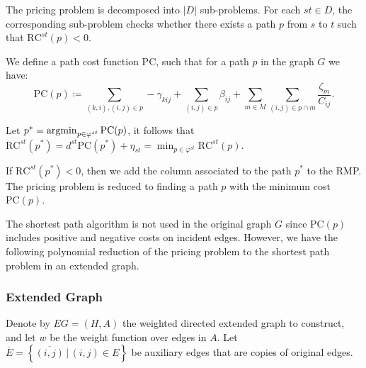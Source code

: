 The pricing problem is decomposed into $|D|$ sub-problems. For each $st \in D$, the corresponding sub-problem checks whether there exists a path \(p\) from $s$ to $t$ such that \(\textrm{RC}^{st}(p) < 0\).

We define a path cost function \(\textrm{PC}\), such that for a path $p$ in the graph $G$ we have:
\begin{equation}\textrm{PC}(p) \coloneqq \sum_{(k,i),(i,j) \in p} -\gamma_{kij}+\sum_{(i,j) \in p} \beta_{ij} +\sum_{m \in M}\sum_{(i,j) \in p \cap m} \frac{\zeta_{m}}{C_{ij}}.
\end{equation}

Let $p^\ast = \operatorname{argmin}_{p \in \varphi^{st}} \textrm{PC}(p)$, it follows that $\textrm{RC}^{st}(p^\ast) = d^{st} \textrm{PC}(p^\ast) + \eta_{st}  = \min_{p \in \varphi^{st}}\textrm{RC}^{st}(p)$.

If $\textrm{RC}^{st}(p^\ast) <0$, then we add the column associated to the path \(p^\ast\) to the RMP. \\

The pricing problem is reduced to finding a path $p$ with the minimum cost $\textrm{PC}(p)$.

The shortest path algorithm is not used in the original graph \(G\) since \(\textrm{PC}(p)\) includes positive and negative costs on incident edges. However, we have the following polynomial reduction of the pricing problem to the shortest path problem in an extended graph.  

\subsubsection{Extended Graph}
Denote by \(EG = (H, A)\) the weighted directed extended graph to construct,
and let \(w\) be the weight function over edges in \(A\).
Let \(\overline{E} = \left \{\overline{(i,j)}\, |\, (i,j) \in E \right \}\) be auxiliary edges that are copies of original edges.

